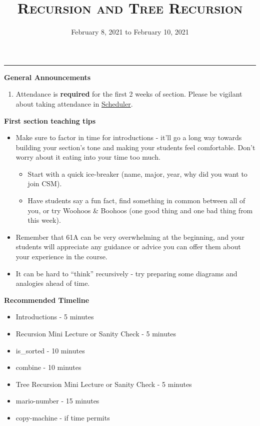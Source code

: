 \documentclass{exam}
\title{\textsc{Recursion and Tree Recursion}}
\date{February 8, 2021 to February 10, 2021}
\begin{document}
\maketitle
\rule{\textwidth}{0.15em}
\fontsize{12}{15}\selectfont

\begin{guide}
\textbf{General Announcements}
\begin{enumerate}
    \item Attendance is \textbf{required} for the first 2 weeks of section. Please be vigilant about taking attendance in \href{https://scheduler.csmentors.org/}{Scheduler}.
\end{enumerate}
\end{guide}

\begin{guide}
\textbf{First section teaching tips}
\begin{itemize}
    \item Make sure to factor in time for introductions - it’ll go a long way towards building your section’s tone and making your students feel comfortable. Don’t worry about it eating into your time too much.
    \begin{itemize}
        \item Start with a quick ice-breaker (name, major, year, why did you want to join CSM).
        \item Have students say a fun fact, find something in common between all of you, or try Woohoos \& Boohoos (one good thing and one bad thing from this week).
    \end{itemize}
    \item Remember that 61A can be very overwhelming at the beginning, and your students will appreciate any guidance or advice you can offer them about your experience in the course.
    \item It can be hard to ``think'' recursively - try preparing some diagrams and analogies ahead of time.
\end{itemize}
\end{guide}

\begin{guide}
\textbf{Recommended Timeline}
\begin{itemize}
    \item Introductions - 5 minutes
    \item Recursion Mini Lecture or Sanity Check - 5 minutes
    \item is\_sorted - 10 minutes
    \item combine - 10 minutes
    \item Tree Recursion Mini Lecture or Sanity Check - 5 minutes
    \item mario-number - 15 minutes
    \item copy-machine - if time permits
\end{itemize}
\end{guide}
\end{document}
